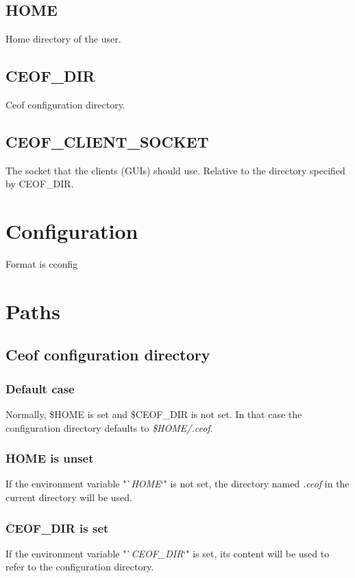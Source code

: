 \documentclass[12pt,a4paper]{book}
\begin{document}
\subsection{HOME}
Home directory of the user.
\subsection{CEOF\_DIR}
Ceof configuration directory.
\subsection{CEOF\_CLIENT\_SOCKET}
The socket that the clients (GUIs) should use.
Relative to the directory specified by CEOF\_DIR.
\section{Configuration}
Format is cconfig
\section{Paths}
\subsection{Ceof configuration directory}
\subsubsection{Default case}
Normally, \$HOME is set and \$CEOF\_DIR is not set. In that case
the configuration directory defaults to \textit{\$HOME/.ceof}.
\subsubsection{HOME is unset}
If the environment variable "`\textit{HOME}`" is not set,
the directory named \textit{.ceof} in the current directory will be used.
\subsubsection{CEOF\_DIR is set}
If the environment variable "`\textit{CEOF\_DIR}`" is set,
its content will be used to refer to the configuration directory.
\end{document}

